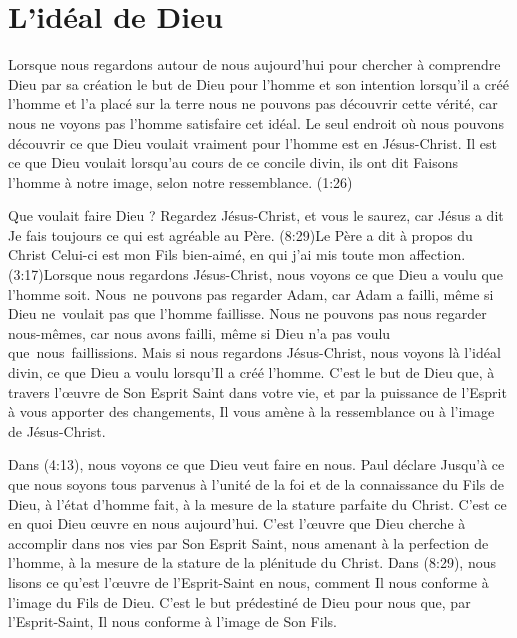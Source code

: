 \section{L'id\'eal de Dieu}

Lorsque nous regardons autour de nous aujourd'hui pour
 chercher à comprendre Dieu par sa création
 \ocadr le but de Dieu pour l'homme et son intention
 lorsqu'il a créé l'homme et l'a placé sur la terre \fcadr{}
 nous ne pouvons pas découvrir cette vérité,
 car nous ne voyons pas l'homme satisfaire cet idéal.
 Le seul endroit où nous pouvons découvrir ce que Dieu voulait vraiment
 pour l'homme est en Jésus-Christ.
 Il est ce que Dieu voulait lorsqu'au cours de ce concile divin, ils ont dit\frcolon{}
 \Og Faisons l'homme à notre image, selon notre ressemblance. \Fg{}
 (1:26)

Que voulait faire Dieu ?
 Regardez Jésus-Christ, et vous le saurez, car Jésus a dit\frcolon{}
 \Og Je fais toujours ce qui est agréable au Père. \Fg{}
 (8:29)Le Père a dit à propos du Christ\frcolon{}
 \Og Celui-ci est mon Fils bien-aimé, en qui j'ai mis toute mon affection. \Fg{}
 (3:17)Lorsque nous regardons Jésus-Christ,
 nous voyons ce que Dieu a voulu que l'homme soit.
 Nous~ne pouvons pas regarder Adam, car Adam a failli,
 même si Dieu ne~voulait pas que l'homme faillisse.
 Nous ne pouvons pas nous regarder nous-mêmes,
 car nous avons failli, même si Dieu n'a pas voulu que~nous~faillissions.
 Mais si nous regardons Jésus-Christ, nous voyons là l'idéal divin,
 ce que Dieu a voulu lorsqu'Il a créé l'homme.
 C'est le but de Dieu que, à travers l'œuvre de Son Esprit Saint dans votre vie,
 et par la puissance de l'Esprit à vous apporter des changements,
 Il vous amène à la ressemblance ou à l'image de Jésus-Christ.

Dans (4:13), nous voyons ce que Dieu veut faire en nous.
 Paul déclare\frcolon{}
 \Og Jusqu'à ce que nous soyons tous parvenus à l'unité de la foi
 et de la connaissance du Fils de Dieu, à l'état d'homme fait,
 à la mesure de la stature parfaite du Christ. \Fg{}
 C'est ce en quoi Dieu œuvre en nous aujourd'hui.
 C'est l'œuvre que Dieu cherche à accomplir dans nos vies
 par Son Esprit Saint, nous amenant à la perfection de l'homme,
 à la mesure de la stature de la plénitude du Christ.
 Dans (8:29), nous lisons
 ce qu'est l'œuvre de l'Esprit-Saint en nous,
 comment Il nous conforme à l'image du Fils de Dieu.
 C'est le but prédestiné de Dieu pour nous
 que, par l'Esprit-Saint, Il nous conforme à l'image de Son Fils.


